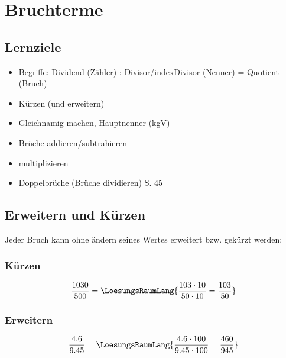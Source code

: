 \newpage
\section{Bruchterme}\label{bruchterme}

\subsection*{Lernziele}

\begin{itemize}
	\item Begriffe: Dividend (Zähler) :
  Divisor/index{Divisor} (Nenner) = Quotient (Bruch)
  \item Kürzen (und erweitern)
	\item Gleichnamig machen, Hauptnenner (kgV)
	\item Brüche addieren/subtrahieren
  \item multiplizieren
	\item Doppelbrüche (Brüche dividieren) S. 45 \cite{marthaler21alg}
\end{itemize}


\newpage

\subsection{Erweitern und Kürzen}

Jeder Bruch kann ohne ändern seines Wertes erweitert bzw. gekürzt
werden:

\subsubsection{Kürzen}
$$\frac{1030}{500} = \LoesungsRaumLang{\frac{103\cdot{} 10}{50\cdot{}10} =\frac{103}{50}}$$


\subsubsection{Erweitern}
$$\frac{4.6}{9.45} = \LoesungsRaumLang{\frac{4.6 \cdot{}100}{9.45\cdot{}100} =
\frac{460}{945}}$$
\newpage


